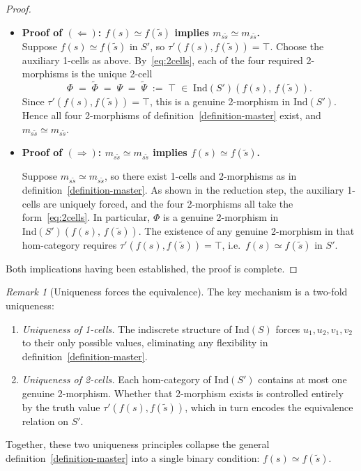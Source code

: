 \documentclass[a4paper,10pt]{article}
\theoremstyle{plain}
\theoremstyle{definition}
\theoremstyle{remark}
\newtheorem{remark}[theorem]{Remark}
\begin{document}
\begin{proof}
\begin{itemize}
  \item \textbf{Proof of $(\Leftarrow)$: $f(s) \simeq f(\tilde{s})$
    implies $m_{s\tilde{s}} \simeq m_{s\tilde{s}}$.} \\
  Suppose $f(s) \simeq f(\tilde{s})$ in $S'$, so $\tau'(f(s),f(\tilde{s}))
    = \top$. Choose the auxiliary 1-cells as above. By~\eqref{eq:2cells}, each
  of the four required 2-morphisms is the unique 2-cell
  \[
    \Phi \;=\; \widetilde{\Phi} \;=\; \Psi \;=\; \widetilde{\Psi}
    \;:=\; \top
    \;\in\; \mathrm{Ind}(S')(f(s),\,f(\tilde{s})).
  \]
  Since $\tau'(f(s), f(\tilde{s})) = \top$, this is a genuine 2-morphism
  in $\mathrm{Ind}(S')$. Hence all four 2-morphisms of definition~\ref{definition-master}
  exist, and $m_{s\tilde{s}} \simeq m_{s\tilde{s}}$.

 \item \textbf{Proof of $(\Rightarrow)$: $m_{s\tilde{s}} \simeq m_{s\tilde{s}}$ implies
    $f(s) \simeq f(\tilde{s})$.}

  \medskip
  Suppose $m_{s\tilde{s}} \simeq m_{s\tilde{s}}$, so there exist 1-cells and 2-morphisms as in
  definition~\ref{definition-master}. As shown in the reduction step, the auxiliary
  1-cells are uniquely forced, and the four 2-morphisms all take the
  form~\eqref{eq:2cells}. In particular, $\Phi$ is a genuine 2-morphism in
  $\mathrm{Ind}(S')(f(s),\,f(\tilde{s}))$. The existence of any genuine 2-morphism in
  that hom-category requires $\tau'(f(s), f(\tilde{s})) = \top$, i.e.\
  $f(s) \simeq f(\tilde{s})$ in $S'$.
  \end{itemize}
  Both implications having been established, the proof is complete.
\end{proof}

\begin{remark}[Uniqueness forces the equivalence]
  The key mechanism is a two-fold uniqueness:
  \begin{enumerate}
    \item \emph{Uniqueness of 1-cells.} The indiscrete structure of
          $\mathrm{Ind}(S)$ forces $u_1, u_2, v_1, v_2$ to their only possible values,
          eliminating any flexibility in definition~\ref{definition-master}.
    \item \emph{Uniqueness of 2-cells.} Each hom-category of $\mathrm{Ind}(S')$
          contains at most one genuine 2-morphism. Whether that 2-morphism
          exists is controlled entirely by the truth value
          $\tau'(f(s), f(\tilde{s}))$, which in turn encodes the equivalence
          relation on $S'$.
  \end{enumerate}
  Together, these two uniqueness principles collapse the general
  definition~\ref{definition-master} into a single binary condition:
  $f(s) \simeq f(\tilde{s})$.
\end{remark}
\end{document}

